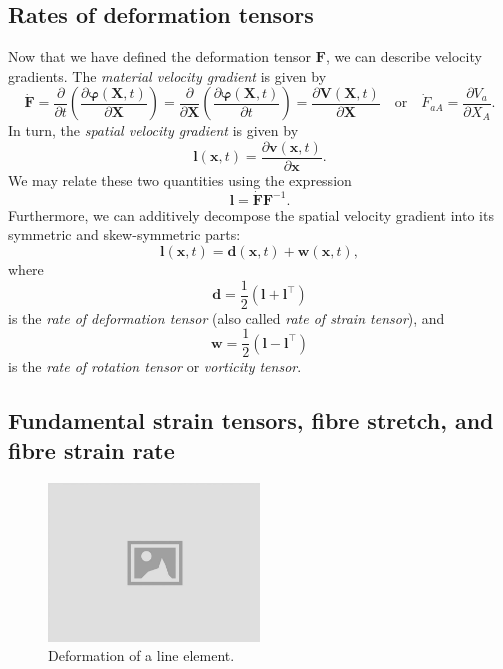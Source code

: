 \documentclass{sfuthesis}
\numberwithin{equation}{section}
\numberwithin{figure}{chapter}
\numberwithin{table}{chapter}
\theoremstyle{definition}
\def\*#1{{\mathbf{#1}}} %
\newcommand{\pder}[2]{\dfrac{\partial #1}{\partial #2}}
\newcommand{\T}{\top}
\def\bphi{{\bm{\varphi}}}
\begin{document}
\subsection{Rates of deformation tensors}

Now that we have defined the deformation tensor $\*F$, we can describe velocity gradients. The \textit{material velocity gradient} is given by
\begin{equation}
\dot{\*F} = \pder{}{t} \left( \pder{\bphi(\*X,t)}{\*X} \right) = \pder{}{\*X} \left( \pder{\bphi(\*X,t)}{t} \right) = \pder{\*V(\*X,t)}{\*X} \quad \text{or} \quad \dot{F}_{aA} = \pder{V_a}{X_A}.
\end{equation}
In turn, the \textit{spatial velocity gradient} is given by
\begin{equation}
\*l(\*x,t) = \pder{\*v(\*x,t)}{\*x}.
\end{equation}
We may relate these two quantities using the expression
\begin{equation} \label{eq:def_l_spatial_velocity_gradient}
\*l = \dot{\*F} \*F^{-1}.
\end{equation}
Furthermore, we can additively decompose the spatial velocity gradient into its symmetric and skew-symmetric parts:
\begin{equation}
\*l(\*x,t) = \*d(\*x,t) + \*w(\*x,t),
\end{equation}
where
\begin{equation}
\*d = \dfrac{1}{2}(\*l + \*l^\T)
\end{equation}
is the \textit{rate of deformation tensor} (also called \textit{rate of strain tensor}), and
\begin{equation}
\*w = \dfrac{1}{2}(\*l - \*l^\T)
\end{equation}
is the \textit{rate of rotation tensor} or \textit{vorticity tensor}. %

\subsection{Fundamental strain tensors, fibre stretch, and fibre strain rate}

\begin{figure}
    \centering
    \includegraphics[width=0.5\textwidth]{placeholder-img.jpg}
    \caption{Deformation of a line element. \label{fig:potato_line_element}}
\end{figure}
\end{document}
